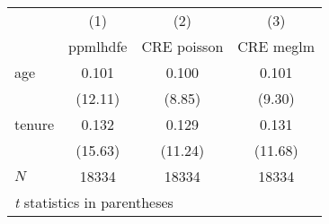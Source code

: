 
\begin{tabular}{l*{3}{c}}
\hline\hline
            &\multicolumn{1}{c}{(1)}&\multicolumn{1}{c}{(2)}&\multicolumn{1}{c}{(3)}\\
            &\multicolumn{1}{c}{ppmlhdfe}&\multicolumn{1}{c}{CRE poisson}&\multicolumn{1}{c}{CRE meglm}\\
\hline
age         &       0.101&       0.100&       0.101\\
            &     (12.11)&      (8.85)&      (9.30)\\
tenure      &       0.132&       0.129&       0.131\\
            &     (15.63)&     (11.24)&     (11.68)\\
\hline
\(N\)       &       18334&       18334&       18334\\
\hline\hline
\multicolumn{4}{l}{\footnotesize \textit{t} statistics in parentheses}\\
\end{tabular}
